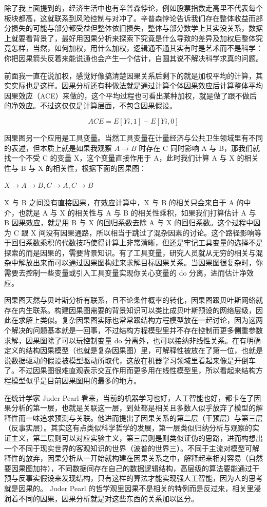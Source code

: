 \documentclass[]{tufte-book}
\begin{document}
除了我上面提到的，经济生活中也有辛普森悖论，例如股票指数走高里不代表每个板块都高，这就联系到风险控制与对冲了。辛普森悖论告诉我们存在整体收益而部分损失的可能与部分都受益但整体依旧损失，整体与部分数学上其实没关系，数据上就要看背景了，最好用因果分析来探索下究竟是什么导致的差异及加权后整体究竟怎样，当然，如何加权，用什么加权，逻辑通不通其实有时是艺术而不是科学：你把因果箭头反着来能说通也会产生一个估计，自圆其说不解决科学求真的问题。

前面我一直在说加权，感觉好像搞清楚因果关系后剩下的就是加权平均的计算，其实实际也是这样。因果分析还有种做法就是通过计算个体因果效应后计算整体平均因果效应（ACE）来做的，这个平均过程也可看出某种加权，就是做了跟不做后的净效应。不过这仅仅是计算层面，不包含因果假设。

\[ACE = E[Y{i,1}] −E[Y{i,0}]\]

因果图另一个应用是工具变量。当然工具变量在计量经济与公共卫生领域里有不同的表述，但本质上就是如果我观察 \(A \rightarrow B\) 时存在 C 同时影响 A 与 B，那我们就找一个不受 C 的变量 X，这个变量直接作用于 A，此时我们计算 A 与 X 的相关性与 B 与 X 的相关性，根据下面的因果图：

\(X \rightarrow A \rightarrow B, C \rightarrow A, C \rightarrow B\)

X 与 B 之间没有直接因果，在效应计算中，X 与 B 的相关只会来自于 A 的中介，也就是 A 与 X 的相关性与 A 与 B 的相关性乘积，如果我们打算估计 A 与 B 因果效应，就是用 B 与 X 的回归系数去除 A 与 X 的回归系数。这个过程中因为 C 跟 X 间没有因果通路，所以相当于跳过了混杂因素的讨论。这个路径影响等于回归系数乘积的代数技巧使得计算上非常清晰，但还是牢记工具变量的选择不是探索的而是因果的，需要背景知识。有了工具变量，研究人员就从无穷的相关与混杂中解放出来而可以通过因果图构建来求解目标因果关系。当因果图很复杂时，你需要去控制一些变量或引入工具变量实现你关心变量的 do 分离，进而估计净效应。

因果图天然与贝叶斯分析有联系，且不论条件概率的转化，因果图跟贝叶斯网络就存在内生联系。构建因果图需要的背景知识可以类比成贝叶斯预设的网络层级，因此在求解上类似。复杂因果图实际也常常跟结构方程模型放在一起讨论，因为这两个解决的问题基本就是一回事，不过结构方程模型里并不存在控制而更多侧重参数求解，因果图除了可以玩控制变量 do 分离外，也可以接纳非线性关系。在有明确定义的结构因果模型（也就是复杂因果图）里，可解释性被放在了第一位，也就是说数据驱动的假设被模型驱动所取代，这放在机器学习领域里看起来像是开倒车了。不过因果图很难直观表示交互作用而更多用在线性模型里，所以看起来结构方程模型似乎是目前因果图用的最多的地方。

在统计学家 Juder Pearl 看来，当前的机器学习也好，人工智能也好，都卡在了因果分析的第一层，也就是关联这一层，到处都是相关且多数人似乎放弃了模型的解释性而一味追求预测与关联。他进而提出了因果关系的第二层（干预层）与第三层（反事实层）。其实这有点类似科学哲学的发展，第一层类似归纳分析与观察的实证主义，第二层则可以对应实验主义，第三层则是则类似证伪的思路，进而构想出一个不同于现实世界的客观知识的世界（波普的世界三）。不同于主流对模型可解释性的放弃，因果分析从一开始就构建在因果关系之中，解释起来相对容易（自然要因果图加持），不同数据间存在自己的数据逻辑结构，高层级的算法要能通过干预与反事实假设来发现结构，只有这样的算法才能实现强人工智能，因为人的思考就是因果的。 Juder Pearl 的哲学观里因果不是相关的特例而是反过来，相关里浸润着不同的因果，因果分析就是对这些东西的关系加以区分。
\end{document}
